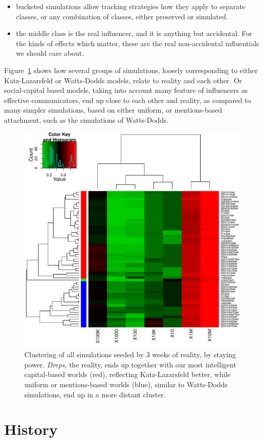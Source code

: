 \documentclass[10pt,oneside]{memoir}
\begin{document}
\begin{itemize}
\item bucketed simulations allow tracking strategies how they apply to separate classes, or any combination of classes, either preserved or simulated.




\item the middle class is the real influencer, and it is anything but accidental.  For the kinds of effects which matter, these are the real non-accidental influentials we should care about.



\end{itemize}

Figure~\ref{figure:heatmap-srates-medians-3wk} shows how several groups of simulations, loosely corresponding to either Katz-Lazarsfeld or Watts-Dodds models, relate to reality and each other.  Or social-capital based models, taking into account many feature of influencers as effective communicators, end up close to each other and reality, as compared to many simpler simulations, based on either uniform, or mentions-based attachment, such as the simulations of Watts-Dodds.



\begin{figure}
\begin{center}
    \includegraphics{figures/heatmap-srates-medians-3wk}
    \caption{Clustering of all simulations seeded by 3 weeks of reality, by staying power.  \emph{Dreps}, the reality, ends up together with our most intelligent capital-based worlds (red), reflecting Katz-Lazarsfeld better,  while uniform or mentions-based worlds (blue), similar to Watts-Dodds simulations, end up in a more distant cluster.}
    \label{figure:heatmap-srates-medians-3wk}
\end{center}
\end{figure}
\pagebreak \section{History}
\label{history}
\end{document}
